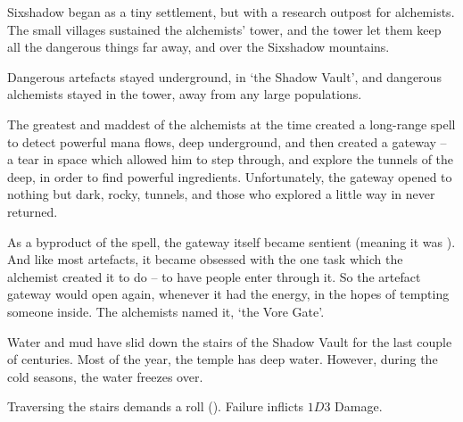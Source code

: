


\begin{exampletext}
  Sixshadow began as a tiny settlement, but with a research outpost for alchemists.
  The small villages sustained the alchemists' tower, and the tower let them keep all the dangerous things far away, and over the Sixshadow mountains.

  Dangerous \glspl{artefact} stayed underground, in `the Shadow Vault', and dangerous alchemists stayed in the tower, away from any large populations.

  The greatest and maddest of the alchemists at the time created a long-range spell to detect powerful mana flows, deep underground, and then created a gateway -- a tear in space which allowed him to step through, and explore the tunnels of the \gls{deep}, in order to find powerful \glspl{ingredient}.
  Unfortunately, the gateway opened to nothing but dark, rocky, tunnels, and those who explored a little way in never returned.

  As a byproduct of the spell, the gateway itself became sentient (meaning it was ).
  And like most \glspl{artefact}, it became obsessed with the one task which the alchemist created it to do -- to have people enter through it.
  So the \gls{artefact} gateway would open again, whenever it had the energy, in the hopes of tempting someone inside.
  The alchemists named it, `the Vore Gate'.
\end{exampletext}


\begin{exampletext}
  Water and mud have slid down the stairs of the Shadow Vault for the last couple of centuries.
  Most of the year, the temple has deep water.
  However, during the cold seasons, the water freezes over.
\end{exampletext}

Traversing the stairs demands a  roll (\tn[8]).
Failure inflicts $1D3$ Damage.


